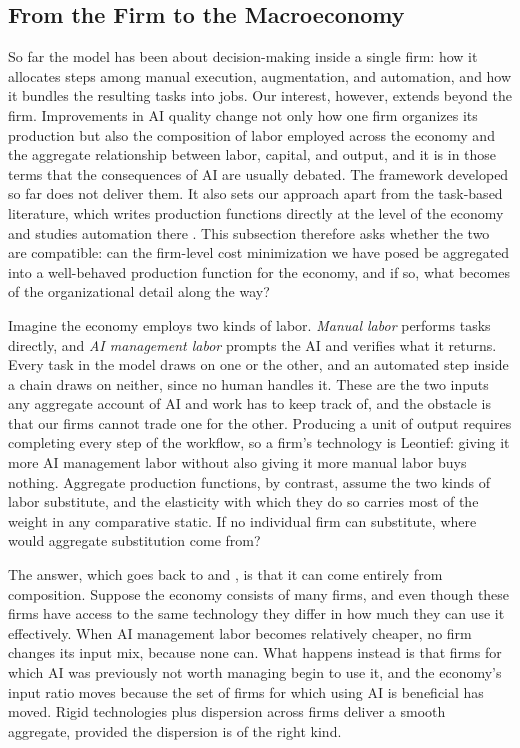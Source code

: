 \subsection{From the Firm to the Macroeconomy}
\label{sec:longrun.aggregation}

So far the model has been about decision-making inside a single firm: how it allocates steps among manual execution, augmentation, and automation, and how it bundles the resulting tasks into jobs.
Our interest, however, extends beyond the firm.
Improvements in AI quality change not only how one firm organizes its production but also the composition of labor employed across the economy and the aggregate relationship between labor, capital, and output, and it is in those terms that the consequences of AI are usually debated.
The framework developed so far does not deliver them.
It also sets our approach apart from the task-based literature, which writes production functions directly at the level of the economy and studies automation there \citep{acemoglu2018, acemoglu2022artificial, acemoglu2024tasks}.
This subsection therefore asks whether the two are compatible: can the firm-level cost minimization we have posed be aggregated into a well-behaved production function for the economy, and if so, what becomes of the organizational detail along the way?

Imagine the economy employs two kinds of labor.
\emph{Manual labor} performs tasks directly, and \emph{AI management labor} prompts the AI and verifies what it returns.
Every task in the model draws on one or the other, and an automated step inside a chain draws on neither, since no human handles it.
These are the two inputs any aggregate account of AI and work has to keep track of, and the obstacle is that our firms cannot trade one for the other.
Producing a unit of output requires completing every step of the workflow, so a firm's technology is Leontief: giving it more AI management labor without also giving it more manual labor buys nothing.
Aggregate production functions, by contrast, assume the two kinds of labor substitute, and the elasticity with which they do so carries most of the weight in any comparative static.
If no individual firm can substitute, where would aggregate substitution come from?

The answer, which goes back to \citet{houthakker1955pareto} and \citet{levhari1968note}, is that it can come entirely from composition.
Suppose the economy consists of many firms, and even though these firms have access to the same technology they differ in how much they can use it effectively.
When AI management labor becomes relatively cheaper, no firm changes its input mix, because none can.
What happens instead is that firms for which AI was previously not worth managing begin to use it, and the economy's input ratio moves because the set of firms for which using AI is beneficial has moved.
Rigid technologies plus dispersion across firms deliver a smooth aggregate, provided the dispersion is of the right kind.

